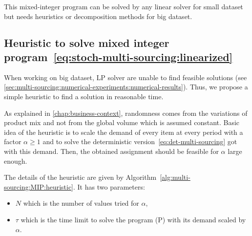 This mixed-integer program can be solved by any linear solver for small dataset but needs heuristics or decomposition methods for big dataset.


\subsection{Heuristic to solve mixed integer program~\eqref{eq:stoch-multi-sourcing:linearized}}


When working on big dataset, LP solver are unable to find feasible solutions (see \cref{sec:multi-sourcing:numerical-experiments:numerical-results}).
Thus, we propose a simple heuristic to find a solution in reasonable time.


As explained in \cref{chap:business-context}, randomness comes from the variations of product mix and not from the global volume which is assumed constant.
Basic idea of the heuristic is to scale the demand of every item at every period with a factor $\alpha\ge1$ and to solve the deterministic version~\eqref{eq:det-multi-sourcing} got with this demand.
Then, the obtained assignment should be feasible for $\alpha$ large enough.


The details of the heuristic are given by Algorithm~\ref{alg:multi-sourcing:MIP:heuristic}.
It has two parameters:
\begin{itemize}
  \item $N$ which is the number of values tried for $\alpha$,
  \item $\tau$ which is the time limit to solve the program (P) with its demand scaled by $\alpha$.
\end{itemize}


